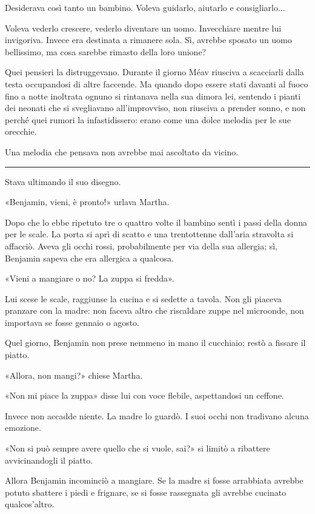 \documentclass[a4paper,11pt,oneside,openright,final]{memoir}
\begin{document}
Desiderava così tanto un bambino. Voleva guidarlo, aiutarlo e consigliarlo...

Voleva vederlo crescere, vederlo diventare un uomo. Invecchiare mentre lui
invigoriva. Invece era destinata a rimanere sola. Sì, avrebbe sposato un uomo
bellissimo, ma cosa sarebbe rimasto della loro unione?

Quei pensieri la distruggevano. Durante il giorno Méav riusciva a scacciarli
dalla testa occupandosi di altre faccende. Ma quando dopo essere stati davanti
al fuoco fino a notte inoltrata ognuno si rintanava nella sua dimora lei,
sentendo i pianti dei neonati che si svegliavano all'improvviso, non riusciva a
prender sonno, e non perché quei rumori la infastidissero: erano come una dolce
melodia per le sue orecchie.

Una melodia che pensava non avrebbe mai ascoltato da vicino.

\plainbreak{1}

Stava ultimando il suo disegno.

«Benjamin, vieni, è pronto!» urlava Martha.

Dopo che lo ebbe ripetuto tre o quattro volte il bambino sentì i passi della
donna per le scale. La porta si aprì di scatto e una trentottenne dall'aria
stravolta si affacciò. Aveva gli occhi rossi, probabilmente per via della sua
allergia; sì, Benjamin sapeva che era allergica a qualcosa.

«Vieni a mangiare o no? La zuppa si fredda».

Lui scese le scale, raggiunse la cucina e si sedette a tavola. Non gli piaceva
pranzare con la madre: non faceva altro che riscaldare zuppe nel microonde, non
importava se fosse gennaio o agosto.

Quel giorno, Benjamin non prese nemmeno in mano il cucchiaio; restò a fissare
il piatto.

«Allora, non mangi?» chiese Martha.

«Non mi piace la zuppa» disse lui con voce flebile, aspettandosi un ceffone.

Invece non accadde niente. La madre lo guardò. I suoi occhi non tradivano
alcuna emozione.

«Non si può sempre avere quello che si vuole, sai?» si limitò a ribattere
avvicinandogli il piatto.

Allora Benjamin incominciò a mangiare. Se la madre si fosse arrabbiata avrebbe
potuto sbattere i piedi e frignare, se si fosse rassegnata gli avrebbe cucinato
qualcos'altro.
\end{document}
